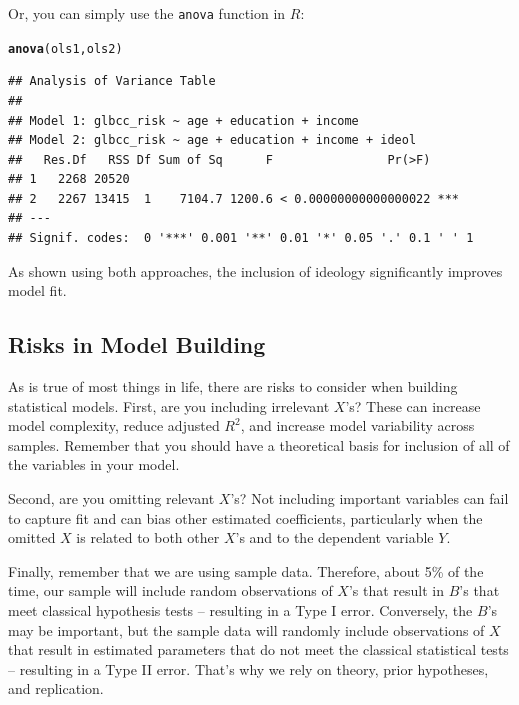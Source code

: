 \documentclass[11pt,openany]{book}\usepackage[]{graphicx}\usepackage[]{color}
\makeatletter
\newcommand{\hlstd}[1]{\textcolor[rgb]{0.345,0.345,0.345}{#1}}%
\newcommand{\hlkwd}[1]{\textcolor[rgb]{0.737,0.353,0.396}{\textbf{#1}}}%
\newenvironment{kframe}{%
 \def\at@end@of@kframe{}%
 \ifinner\ifhmode%
  \def\at@end@of@kframe{\end{minipage}}%
  \begin{minipage}{\columnwidth}%
 \fi\fi%
 \def\FrameCommand##1{\hskip\@totalleftmargin \hskip-\fboxsep
 \colorbox{shadecolor}{##1}\hskip-\fboxsep
     \hskip-\linewidth \hskip-\@totalleftmargin \hskip\columnwidth}%
 \MakeFramed {\advance\hsize-\width
   \@totalleftmargin\z@ \linewidth\hsize
   \@setminipage}}%
 {\par\unskip\endMakeFramed%
 \at@end@of@kframe}
\newenvironment{knitrout}{}{} %
\renewenvironment{knitrout}{\begin{singlespace}}{\end{singlespace}} %
\makeatother
\begin{document}
Or, you can simply use the \texttt{anova} function in $R$: 
\begin{knitrout}
\color{fgcolor}\begin{kframe}
\begin{alltt}
\hlkwd{anova}\hlstd{(ols1, ols2)}
\end{alltt}
\begin{verbatim}
## Analysis of Variance Table
## 
## Model 1: glbcc_risk ~ age + education + income
## Model 2: glbcc_risk ~ age + education + income + ideol
##   Res.Df   RSS Df Sum of Sq      F                Pr(>F)    
## 1   2268 20520                                              
## 2   2267 13415  1    7104.7 1200.6 < 0.00000000000000022 ***
## ---
## Signif. codes:  0 '***' 0.001 '**' 0.01 '*' 0.05 '.' 0.1 ' ' 1
\end{verbatim}
\end{kframe}
\end{knitrout}

\noindent As shown using both approaches, the inclusion of ideology significantly improves model fit. 

\subsection{Risks in Model Building}

As is true of most things in life, there are risks to consider when building statistical models. First, are you including irrelevant $X$'s? These can increase model complexity, reduce adjusted $R^2$, and  increase model variability across samples. Remember that you should have a theoretical basis for inclusion of all of the variables in your model. 

Second, are you omitting relevant $X$'s? Not including important variables can fail to capture fit and can bias other estimated coefficients, particularly when the omitted $X$ is related to both other $X$'s and to the dependent variable $Y$. 

Finally, remember that we are using sample data. Therefore, about 5\% of the time, our sample will include random observations of $X$'s that result in $B$'s that meet classical hypothesis tests -- resulting in a Type I error. Conversely, the $B$'s may be important, but the sample data will randomly include observations of $X$ that result in estimated parameters that do not meet  the classical statistical tests -- resulting in a Type II error.  That's why we rely on theory, prior hypotheses, and replication. 
\end{document}
